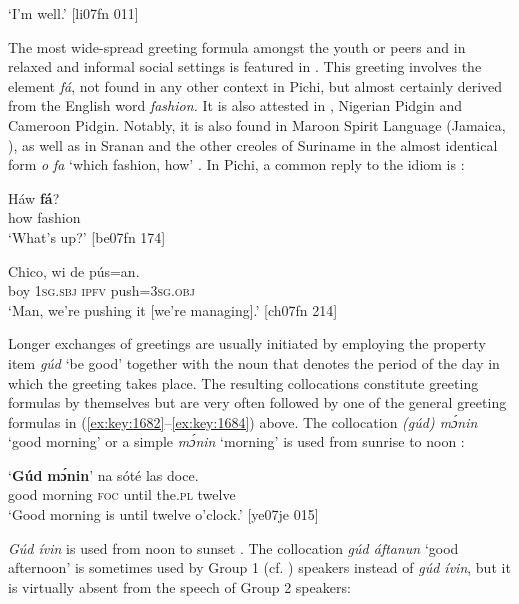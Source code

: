 \glt ‘I’m well.’ [li07fn 011]
\z

The most wide-spread greeting formula amongst the youth or peers and in relaxed and informal social settings is featured in . This greeting involves the element \textit{fá}, not found in any other context in Pichi, but almost certainly derived from the English word \textit{fashion.} It is also attested in , Nigerian Pidgin and Cameroon Pidgin. Notably, it is also found in Maroon Spirit Language (Jamaica, \citealt[50]{Bilby1983}), as well as in Sranan and the other creoles of Suriname in the almost identical form \textit{o} \textit{fa} ‘which fashion, how’ \citep[50]{Wilner1994}. In Pichi, a common reply to the idiom is :


\ea%
    \label{ex:key:1688}
    \gll Háw    \textbf{fá}?\\
how    fashion\\

\glt ‘What’s up?’ [be07fn 174]
\z


\ea%
    \label{ex:key:1689}
    \gll Chico,  wi    de  pús=an.\\
boy    \textsc{1sg.sbj}  \textsc{ipfv}  push=\textsc{3sg.obj}\\

\glt ‘Man, we’re pushing it [we’re managing].’ [ch07fn 214]
\z

Longer exchanges of greetings are usually initiated by employing the property item \textit{gúd} ‘be good’ together with the noun that denotes the period of the day in which the greeting takes place. The resulting collocations constitute greeting formulas by themselves but are very often followed by one of the general greeting formulas in (\ref{ex:key:1682}–\ref{ex:key:1684}) above. The collocation \textit{(gúd) mɔ́nin} ‘good morning’ or a simple \textit{mɔ́nin} ‘morning’ is used from sunrise to noon :


\ea%
    \label{ex:key:1690}
    \gll ‘\textbf{Gúd}  \textbf{mɔ́nin}’  na  sóté    las    doce.\\
\phantom{‘}good  morning  \textsc{foc}  until  the.\textsc{pl}  twelve\\

\glt ‘Good morning is until twelve o’clock.’ [ye07je 015]
\z

\textit{Gúd ívin} is used from noon to sunset . The collocation \textit{gúd áftanun} ‘good afternoon’ is sometimes used by Group 1 (cf. ) speakers instead of \textit{gúd ívin}, but it is virtually absent from the speech of Group 2 speakers:


